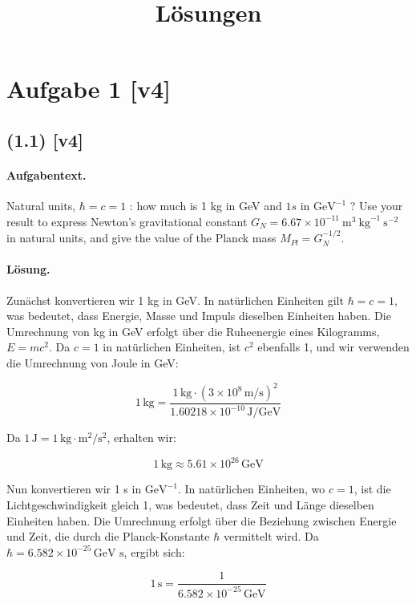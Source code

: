 \documentclass[11pt,a4paper]{article}
\title{Lösungen}
\date{}
\begin{document}
\maketitle

\section*{Aufgabe 1 [v4]}
\subsection*{(1.1) [v4]}
\paragraph{Aufgabentext.}
Natural units, $\hbar=c=1$ : how much is 1 kg in GeV and $1 s$ in $\mathrm{GeV}^{-1}$ ? Use your result to express Newton's gravitational constant $G_N=6.67 \times 10^{-11} \mathrm{~m}^3 \mathrm{~kg}^{-1} \mathrm{~s}^{-2}$ in natural units, and give the value of the Planck mass $M_{P l}=G_N^{-1 / 2}$.

\paragraph{Lösung.}
Zunächst konvertieren wir 1 kg in GeV. In natürlichen Einheiten gilt $\hbar = c = 1$, was bedeutet, dass Energie, Masse und Impuls dieselben Einheiten haben. Die Umrechnung von kg in GeV erfolgt über die Ruheenergie eines Kilogramms, $E = mc^2$. Da $c = 1$ in natürlichen Einheiten, ist $c^2$ ebenfalls 1, und wir verwenden die Umrechnung von Joule in GeV:

\[
1 \, \text{kg} = \frac{1 \, \text{kg} \cdot (3 \times 10^8 \, \text{m/s})^2}{1.60218 \times 10^{-10} \, \text{J/GeV}}
\]

Da $1 \, \text{J} = 1 \, \text{kg} \cdot \text{m}^2/\text{s}^2$, erhalten wir:

\[
1 \, \text{kg} \approx 5.61 \times 10^{26} \, \text{GeV}
\]

Nun konvertieren wir 1 s in $\mathrm{GeV}^{-1}$. In natürlichen Einheiten, wo $c = 1$, ist die Lichtgeschwindigkeit gleich 1, was bedeutet, dass Zeit und Länge dieselben Einheiten haben. Die Umrechnung erfolgt über die Beziehung zwischen Energie und Zeit, die durch die Planck-Konstante $\hbar$ vermittelt wird. Da $\hbar = 6.582 \times 10^{-25} \, \text{GeV s}$, ergibt sich:

\[
1 \, \text{s} = \frac{1}{6.582 \times 10^{-25} \, \text{GeV}}
\]
\end{document}
